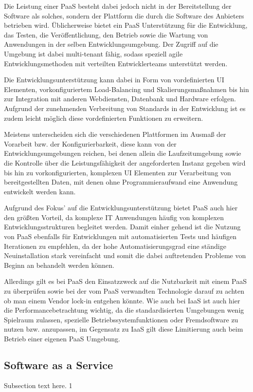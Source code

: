 \documentclass[journal]{IEEEtran}
\begin{document}
Die Leistung einer PaaS besteht dabei jedoch nicht in der Bereitstellung der Software als solches, sondern der Plattform die durch die Software des Anbieters betrieben wird. Üblicherweise bietet ein PaaS Unterstützung für die Entwicklung, das Testen, die Veröffentlichung, den Betrieb sowie die Wartung von Anwendungen in der selben Entwicklungsumgebung. Der Zugriff auf die Umgebung ist dabei multi-tenant fähig, sodass speziell agile Entwicklungsmethoden mit verteilten Entwicklerteams unterstützt werden. 

Die Entwicklungsunterstützung kann dabei in Form von vordefinierten UI Elementen, vorkonfiguriertem Load-Balancing und Skalierungsmaßnahmen bis hin zur Integration mit anderen Webdiensten, Datenbank und Hardware erfolgen. Aufgrund der zunehmenden Verbreitung von Standards in der Entwicklung ist es zudem leicht möglich diese vordefinierten Funktionen zu erweitern. 

Meistens unterscheiden sich die verschiedenen Plattformen im Ausmaß der Vorarbeit bzw. der Konfigurierbarkeit, diese kann von der Entwicklungsumgebungen reichen, bei denen allein die Laufzeitumgebung sowie die Kontrolle über die Leistungsfähigkeit der angeforderten Instanz gegeben wird bis hin zu vorkonfigurierten, komplexen UI Elementen zur Verarbeitung von bereitgestellten Daten, mit denen ohne Programmieraufwand eine Anwendung entwickelt werden kann.

Aufgrund des Fokus' auf die Entwicklungsunterstützung bietet PaaS auch hier den größten Vorteil, da komplexe IT Anwendungen häufig von komplexen Entwicklungsstrukturen begleitet werden. Damit einher gehend ist die Nutzung von PaaS ebenfalls für Entwicklungen mit automatisierten Tests und häufigen Iterationen zu empfehlen, da der hohe Automatisierungsgrad eine ständige Neuinstallation stark vereinfacht und somit die dabei auftretenden Probleme von Beginn an behandelt werden können.

Allerdings gilt es bei PaaS den Einsatzzweck auf die Nutzbarkeit mit einem PaaS zu überprüfen sowie bei der vom PaaS verwandten Technologie darauf zu achten ob man einem Vendor lock-in entgehen könnte. Wie auch bei IaaS ist auch hier die Performancebetrachtung wichtig, da die standardisierten Umgebungen wenig Spielraum zulassen, spezielle Betriebssystemfunktionen oder Fremdsoftware zu nutzen bzw. anzupassen, im Gegensatz zu IaaS gilt diese Limitierung auch beim Betrieb einer eigenen PaaS Umgebung.

\subsection{Software as a Service}
Subsection text here.
1
\end{document}
